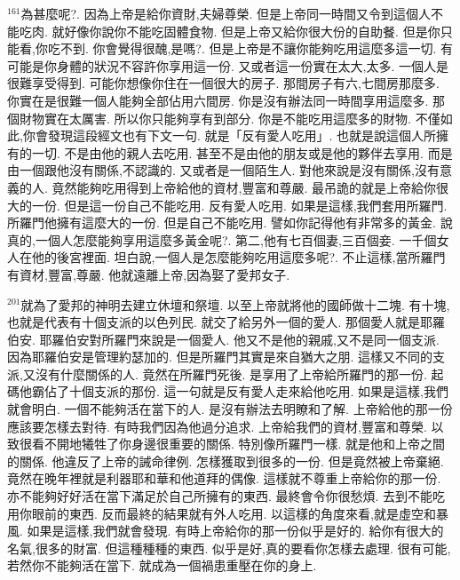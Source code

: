 \documentclass{book}
\begin{document}
$^{161}$為甚麼呢?.
因為上帝是給你資財,夫婦尊榮.
但是上帝同一時間又令到這個人不能吃肉.
就好像你說你不能吃固體食物.
但是上帝又給你很大份的自助餐.
但是你只能看,你吃不到.
你會覺得很醜,是嗎?.
但是上帝是不讓你能夠吃用這麼多這一切.
有可能是你身體的狀況不容許你享用這一份.
又或者這一份實在太大,太多.
一個人是很難享受得到.
可能你想像你住在一個很大的房子.
那間房子有六,七間房那麼多.
你實在是很難一個人能夠全部佔用六間房.
你是沒有辦法同一時間享用這麼多.
那個財物實在太厲害.
所以你只能夠享有到部分.
你是不能吃用這麼多的財物.
不僅如此,你會發現這段經文也有下文一句.
就是「反有愛人吃用」.
也就是說這個人所擁有的一切.
不是由他的親人去吃用.
甚至不是由他的朋友或是他的夥伴去享用.
而是由一個跟他沒有關係,不認識的.
又或者是一個陌生人.
對他來說是沒有關係,沒有意義的人.
竟然能夠吃用得到上帝給他的資材,豐富和尊嚴.
最吊詭的就是上帝給你很大的一份.
但是這一份自己不能吃用.
反有愛人吃用.
如果是這樣,我們套用所羅門.
所羅門他擁有這麼大的一份.
但是自己不能吃用.
譬如你記得他有非常多的黃金.
說真的,一個人怎麼能夠享用這麼多黃金呢?.
第二,他有七百個妻,三百個妾.
一千個女人在他的後宮裡面.
坦白說,一個人是怎麼能夠吃用這麼多呢?.
不止這樣,當所羅門有資材,豐富,尊嚴.
他就遠離上帝,因為娶了愛邦女子.

$^{201}$就為了愛邦的神明去建立休壇和祭壇.
以至上帝就將他的國師做十二塊.
有十塊,也就是代表有十個支派的以色列民.
就交了給另外一個的愛人.
那個愛人就是耶羅伯安.
耶羅伯安對所羅門來說是一個愛人.
他又不是他的親戚,又不是同一個支派.
因為耶羅伯安是管理約瑟加的.
但是所羅門其實是來自猶大之朋.
這樣又不同的支派,又沒有什麼關係的人.
竟然在所羅門死後.
是享用了上帝給所羅門的那一份.
起碼他霸佔了十個支派的那份.
這一句就是反有愛人走來給他吃用.
如果是這樣,我們就會明白.
一個不能夠活在當下的人.
是沒有辦法去明瞭和了解.
上帝給他的那一份應該要怎樣去對待.
有時我們因為他過分追求.
上帝給我們的資材,豐富和尊榮.
以致很看不開地犧牲了你身邊很重要的關係.
特別像所羅門一樣.
就是他和上帝之間的關係.
他違反了上帝的誡命律例.
怎樣獲取到很多的一份.
但是竟然被上帝棄絕.
竟然在晚年裡就是利器耶和華和他道拜的偶像.
這樣就不尊重上帝給你的那一份.
亦不能夠好好活在當下滿足於自己所擁有的東西.
最終會令你很愁煩.
去到不能吃用你眼前的東西.
反而最終的結果就有外人吃用.
以這樣的角度來看,就是虛空和暴風.
如果是這樣,我們就會發現.
有時上帝給你的那一份似乎是好的.
給你有很大的名氣,很多的財富.
但這種種種的東西.
似乎是好,真的要看你怎樣去處理.
很有可能,若然你不能夠活在當下.
就成為一個禍患重壓在你的身上.
\end{document}
